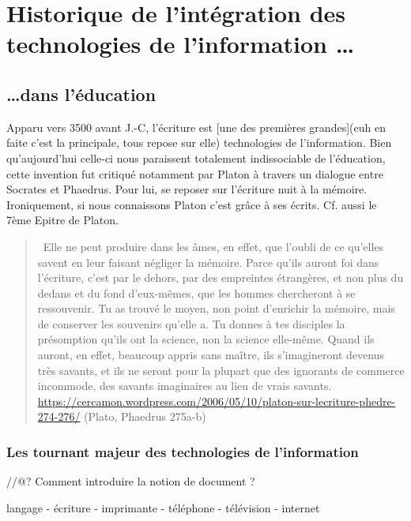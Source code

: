 
\chapter{Historique de l'intégration des technologies de l'information \ldots}\label{quoi}

\section{\ldots dans l'éducation}

Apparu vers 3500 avant J.-C\cite{dreyer00}, l'écriture est [une des premières grandes](euh en
faite c'est la principale, tous repose sur elle) \glspl{technologie} de
l'information. Bien qu'aujourd'hui celle-ci nous paraissent totalement
indissociable de l'éducation, cette invention fut critiqué notamment par Platon
à travers un dialogue entre Socrates et Phaedrus. Pour lui, se reposer sur
l'écriture nuit à la mémoire. Ironiquement, si nous connaissons Platon c'est
grâce à ses écrits. Cf. aussi le 7ème Epitre de Platon.


\begin{quote}
\og{}~Elle ne peut produire dans les âmes, en effet, que l’oubli de ce qu’elles 
savent en leur faisant négliger la mémoire. Parce qu’ils auront foi dans 
l’écriture, c’est par le dehors, par des empreintes étrangères, et non plus du 
dedans et du fond d’eux-mêmes, que les hommes chercheront à se ressouvenir. Tu 
as trouvé le moyen, non point d’enrichir la mémoire, mais de conserver les 
souvenirs qu’elle a. Tu donnes à tes disciples la présomption qu’ils ont la 
science, non la science elle-même. Quand ils auront, en effet, beaucoup appris 
sans maître, ils s’imagineront devenus très savants, et ils ne seront pour la 
plupart que des ignorants de commerce incommode, des savants imaginaires au lieu
 de vrais savants.~\fg{}
\url{https://cercamon.wordpress.com/2006/05/10/platon-sur-lecriture-phedre-274-276/}
(Plato, Phaedrus 275a-b)
\end{quote}

\subsection{Les tournant majeur des technologies de l'information}
//@? Comment introduire la notion de document ?

langage - écriture - imprimante - téléphone - télévision - internet


